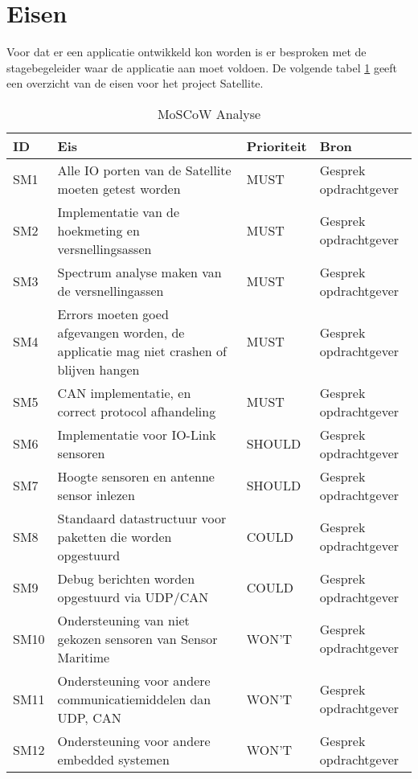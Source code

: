 \section{Eisen}
Voor dat er een applicatie ontwikkeld kon worden is er besproken met de stagebegeleider waar de applicatie aan moet voldoen. De volgende tabel \ref{tab:eisen} geeft een overzicht van de eisen voor het project Satellite.
\begin{table}[h!]
	\centering
	\caption{MoSCoW Analyse}
	\label{tab:eisen}
	\begin{tabular}{lp{9cm}ll}
	\toprule
	\textbf{ID} & \textbf{Eis} & \textbf{Prioriteit} & \textbf{Bron} \\ \midrule
	SM1			& Alle IO porten van de Satellite moeten getest worden 										& MUST		& Gesprek opdrachtgever \\
	SM2			& Implementatie van de hoekmeting en versnellingsassen 										& MUST		& Gesprek opdrachtgever \\ 
	SM3			& Spectrum analyse maken van de versnellingassen 											& MUST		& Gesprek opdrachtgever \\ 
	SM4			& Errors moeten goed afgevangen worden, de applicatie mag niet crashen of blijven hangen 	& MUST		& Gesprek opdrachtgever \\ 
	SM5			& CAN implementatie, en correct protocol afhandeling										& MUST		& Gesprek opdrachtgever \\ \midrule
	SM6			& Implementatie voor IO-Link sensoren 														& SHOULD	& Gesprek opdrachtgever \\
	SM7			& Hoogte sensoren en antenne sensor inlezen 												& SHOULD	& Gesprek opdrachtgever \\  \midrule
	SM8			& Standaard datastructuur voor paketten die worden opgestuurd								& COULD		& Gesprek opdrachtgever \\
	SM9			& Debug berichten worden opgestuurd via UDP/CAN 											& COULD		& Gesprek opdrachtgever \\  \midrule
	SM10		& Ondersteuning van niet gekozen sensoren van Sensor Maritime 								& WON'T		& Gesprek opdrachtgever \\
	SM11		& Ondersteuning voor andere communicatiemiddelen dan UDP, CAN 								& WON'T		& Gesprek opdrachtgever \\
	SM12		& Ondersteuning voor andere embedded systemen  												& WON'T		& Gesprek opdrachtgever \\\bottomrule
	\end{tabular}
\end{table}
